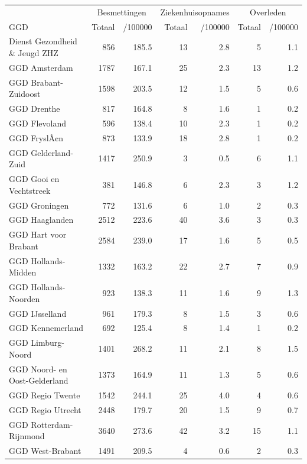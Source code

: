 \documentclass[
  english,
  man,floatsintext]{apa6}
\begin{document}
\begin{table}
\centering\begingroup\fontsize{10}{12}\selectfont

\begin{threeparttable}
\begin{tabular}{lrrrrrr}
\toprule
\multicolumn{1}{c}{ } & \multicolumn{2}{c}{Besmettingen} & \multicolumn{2}{c}{Ziekenhuisopnames} & \multicolumn{2}{c}{Overleden} \\
\cmidrule(l{3pt}r{3pt}){2-3} \cmidrule(l{3pt}r{3pt}){4-5} \cmidrule(l{3pt}r{3pt}){6-7}
GGD & Totaal & /100000 & Totaal & /100000 & Totaal & /100000\\
\midrule
Dienst Gezondheid \& Jeugd ZHZ & 856 & 185.5 & 13 & 2.8 & 5 & 1.1\\
GGD Amsterdam & 1787 & 167.1 & 25 & 2.3 & 13 & 1.2\\
GGD Brabant-Zuidoost & 1598 & 203.5 & 12 & 1.5 & 5 & 0.6\\
GGD Drenthe & 817 & 164.8 & 8 & 1.6 & 1 & 0.2\\
GGD Flevoland & 596 & 138.4 & 10 & 2.3 & 1 & 0.2\\
GGD FryslÃ¢n & 873 & 133.9 & 18 & 2.8 & 1 & 0.2\\
GGD Gelderland-Zuid & 1417 & 250.9 & 3 & 0.5 & 6 & 1.1\\
GGD Gooi en Vechtstreek & 381 & 146.8 & 6 & 2.3 & 3 & 1.2\\
GGD Groningen & 772 & 131.6 & 6 & 1.0 & 2 & 0.3\\
GGD Haaglanden & 2512 & 223.6 & 40 & 3.6 & 3 & 0.3\\
GGD Hart voor Brabant & 2584 & 239.0 & 17 & 1.6 & 5 & 0.5\\
GGD Hollands-Midden & 1332 & 163.2 & 22 & 2.7 & 7 & 0.9\\
GGD Hollands-Noorden & 923 & 138.3 & 11 & 1.6 & 9 & 1.3\\
GGD IJsselland & 961 & 179.3 & 8 & 1.5 & 3 & 0.6\\
GGD Kennemerland & 692 & 125.4 & 8 & 1.4 & 1 & 0.2\\
GGD Limburg-Noord & 1401 & 268.2 & 11 & 2.1 & 8 & 1.5\\
GGD Noord- en Oost-Gelderland & 1373 & 164.9 & 11 & 1.3 & 5 & 0.6\\
GGD Regio Twente & 1542 & 244.1 & 25 & 4.0 & 4 & 0.6\\
GGD Regio Utrecht & 2448 & 179.7 & 20 & 1.5 & 9 & 0.7\\
GGD Rotterdam-Rijnmond & 3640 & 273.6 & 42 & 3.2 & 15 & 1.1\\
GGD West-Brabant & 1491 & 209.5 & 4 & 0.6 & 2 & 0.3\\

\end{tabular}
\end{threeparttable}
\end{table}
\end{document}
